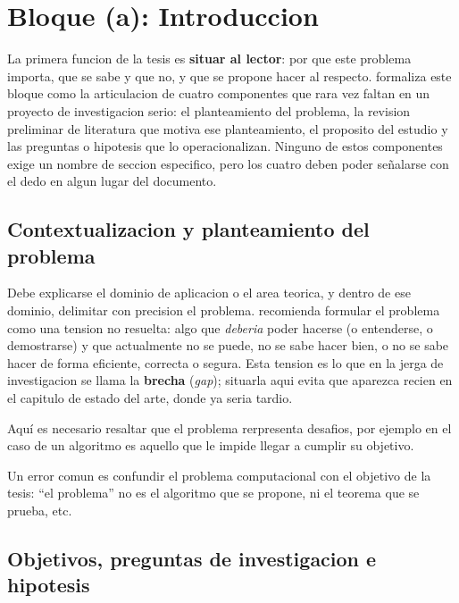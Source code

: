 \documentclass[11pt]{article}
\begin{document}
\section{Bloque (a): Introduccion}

La primera funcion de la tesis es \textbf{situar al lector}: por que este
problema importa, que se sabe y que no, y que se propone hacer al respecto.
\citet{creswell2018research} formaliza este bloque como la articulacion de
cuatro componentes que rara vez faltan en un proyecto de investigacion serio:
el planteamiento del problema, la revision preliminar de literatura que
motiva ese planteamiento, el proposito del estudio y las preguntas o
hipotesis que lo operacionalizan. Ninguno de estos componentes exige un
nombre de seccion especifico, pero los cuatro deben poder señalarse con el
dedo en algun lugar del documento. 


\subsection{Contextualizacion y planteamiento del problema}

Debe explicarse el dominio de aplicacion o el area teorica, y dentro de ese
dominio, delimitar con precision el problema. \citet[cap.~2]{booth2016craft}
recomienda formular el problema como una tension no resuelta: algo que
\emph{deberia} poder hacerse (o entenderse, o demostrarse) y que actualmente
no se puede, no se sabe hacer bien, o no se sabe hacer de forma eficiente,
correcta o segura. Esta tension es lo que en la jerga de investigacion se
llama la \textbf{brecha} (\emph{gap}); situarla aqui evita que aparezca
recien en el capitulo de estado del arte, donde ya seria tardio.

Aquí es necesario resaltar que el problema rerpresenta desafios, por ejemplo
en el caso de un algoritmo es aquello que le impide llegar a cumplir su objetivo.

\begin{cajaAlerta}
Un error comun es confundir el problema computacional con el objetivo de la tesis: 
``el problema'' no es el algoritmo que se propone, ni el teorema que se prueba, etc.
\end{cajaAlerta}

\subsection{Objetivos, preguntas de investigacion e hipotesis}
\end{document}
